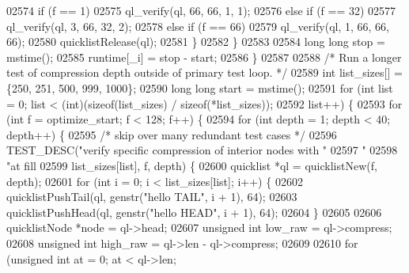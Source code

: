 \begin{DoxyCode}
{{{{{{{{{{{{{{{{{{{{{{{{{{{{{{{{{{{{{{{{{{{{{{{{{{{{{{{{{{{{{{{{{{{{{{{{{{{{{{{{{{{{{{{{{{{{{{{{{{{{{{{02574                 \textcolor{keywordflow}{if} (f == 1)
02575                     ql\_verify(ql, 66, 66, 1, 1);
02576                 \textcolor{keywordflow}{else} \textcolor{keywordflow}{if} (f == 32)
02577                     ql\_verify(ql, 3, 66, 32, 2);
02578                 \textcolor{keywordflow}{else} \textcolor{keywordflow}{if} (f == 66)
02579                     ql\_verify(ql, 1, 66, 66, 66);
02580                 quicklistRelease(ql);
02581             \}
02582         \}
02583 
02584         \textcolor{keywordtype}{long} \textcolor{keywordtype}{long} stop = mstime();
02585         runtime[\_i] = stop - start;
02586     \}
02587 
02588     \textcolor{comment}{/* Run a longer test of compression depth outside of primary test loop. */}
02589     \textcolor{keywordtype}{int} list\_sizes[] = \{250, 251, 500, 999, 1000\};
02590     \textcolor{keywordtype}{long} \textcolor{keywordtype}{long} start = mstime();
02591     \textcolor{keywordflow}{for} (\textcolor{keywordtype}{int} list = 0; list < (\textcolor{keywordtype}{int})(\textcolor{keyword}{sizeof}(list\_sizes) / \textcolor{keyword}{sizeof}(*list\_sizes));
02592          list++) \{
02593         \textcolor{keywordflow}{for} (\textcolor{keywordtype}{int} f = optimize\_start; f < 128; f++) \{
02594             \textcolor{keywordflow}{for} (\textcolor{keywordtype}{int} depth = 1; depth < 40; depth++) \{
02595                 \textcolor{comment}{/* skip over many redundant test cases */}
02596                 TEST\_DESC(\textcolor{stringliteral}{"verify specific compression of interior nodes with "}
02597                           \textcolor{stringliteral}{"%
02598                           \textcolor{stringliteral}{"at fill %
02599                           list\_sizes[list], f, depth) \{
02600                     quicklist *ql = quicklistNew(f, depth);
02601                     \textcolor{keywordflow}{for} (\textcolor{keywordtype}{int} i = 0; i < list\_sizes[list]; i++) \{
02602                         quicklistPushTail(ql, genstr(\textcolor{stringliteral}{"hello TAIL"}, i + 1), 64);
02603                         quicklistPushHead(ql, genstr(\textcolor{stringliteral}{"hello HEAD"}, i + 1), 64);
02604                     \}
02605 
02606                     quicklistNode *node = ql->head;
02607                     \textcolor{keywordtype}{unsigned} \textcolor{keywordtype}{int} low\_raw = ql->compress;
02608                     \textcolor{keywordtype}{unsigned} \textcolor{keywordtype}{int} high\_raw = ql->len - ql->compress;
02609 
02610                     \textcolor{keywordflow}{for} (\textcolor{keywordtype}{unsigned} \textcolor{keywordtype}{int} at = 0; at < ql->len;
}}}}}}}}}}}}}}}}}}}}}}}}}}}}}}}}}}}}}}}}}}}}}}}}}}}}}}}}}}}}}}}}}}}}}}}}}}}}}}}}}}}}}}}}}}}}}}}}}}}}}}}}}
\end{DoxyCode}

